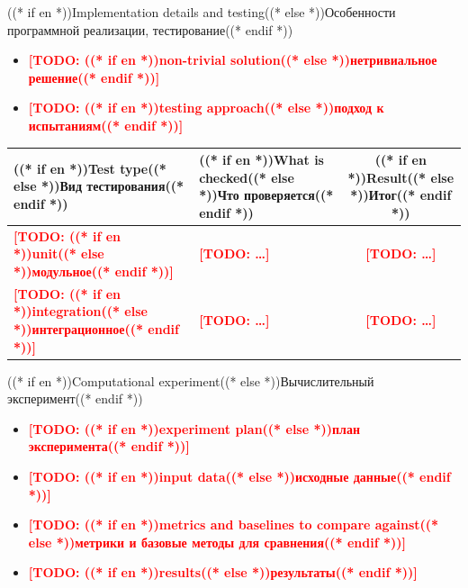 \documentclass[aspectratio=169, 14pt]{beamer}
\newcommand{\todo}[1]{\textcolor{red}{\textbf{[TODO: #1]}}}
\begin{document}
\begin{frame}{((* if en *))Implementation details and testing((* else *))Особенности программной реализации, тестирование((* endif *))}
  \begin{itemize}
    \item \todo{((* if en *))non-trivial solution((* else *))нетривиальное решение((* endif *))}
    \item \todo{((* if en *))testing approach((* else *))подход к испытаниям((* endif *))}
  \end{itemize}

  \vspace{0.4em}
  {\footnotesize
  \begin{tabularx}{\textwidth}{lXc}
    \toprule
    \textbf{((* if en *))Test type((* else *))Вид тестирования((* endif *))} &
    \textbf{((* if en *))What is checked((* else *))Что проверяется((* endif *))} &
    \textbf{((* if en *))Result((* else *))Итог((* endif *))} \\
    \midrule
    \todo{((* if en *))unit((* else *))модульное((* endif *))} & \todo{…} & \todo{…} \\
    \todo{((* if en *))integration((* else *))интеграционное((* endif *))} & \todo{…} & \todo{…} \\
    \bottomrule
  \end{tabularx}}
\end{frame}

\begin{frame}{((* if en *))Computational experiment((* else *))Вычислительный эксперимент((* endif *))}
  \begin{itemize}
    \item \todo{((* if en *))experiment plan((* else *))план эксперимента((* endif *))}
    \item \todo{((* if en *))input data((* else *))исходные данные((* endif *))}
    \item \todo{((* if en *))metrics and baselines to compare against((* else *))метрики и базовые методы для сравнения((* endif *))}
    \item \todo{((* if en *))results((* else *))результаты((* endif *))}
  \end{itemize}
\end{frame}
\end{document}
